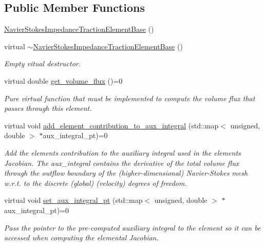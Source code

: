 \subsection*{Public Member Functions}
\begin{DoxyCompactItemize}
\item 
\hyperlink{classoomph_1_1NavierStokesImpedanceTractionElementBase_a5879757e9fd1c596fa2bb60321c97270}{Navier\+Stokes\+Impedance\+Traction\+Element\+Base} ()
\item 
virtual \hyperlink{classoomph_1_1NavierStokesImpedanceTractionElementBase_a3162972ba2dfdff8bbae08f27efaf132}{$\sim$\+Navier\+Stokes\+Impedance\+Traction\+Element\+Base} ()
\begin{DoxyCompactList}\small\item\em Empty vitual destructor. \end{DoxyCompactList}\item 
virtual double \hyperlink{classoomph_1_1NavierStokesImpedanceTractionElementBase_a7f71882ae8a0d34e3d5a5c91586081b3}{get\+\_\+volume\+\_\+flux} ()=0
\begin{DoxyCompactList}\small\item\em Pure virtual function that must be implemented to compute the volume flux that passes through this element. \end{DoxyCompactList}\item 
virtual void \hyperlink{classoomph_1_1NavierStokesImpedanceTractionElementBase_a4ce2150b59ff999c24e623b645f1c899}{add\+\_\+element\+\_\+contribution\+\_\+to\+\_\+aux\+\_\+integral} (std\+::map$<$ unsigned, double $>$ $\ast$aux\+\_\+integral\+\_\+pt)=0
\begin{DoxyCompactList}\small\item\em Add the element\textquotesingle{}s contribution to the auxiliary integral used in the element\textquotesingle{}s Jacobian. The aux\+\_\+integral contains the derivative of the total volume flux through the outflow boundary of the (higher-\/dimensional) Navier-\/\+Stokes mesh w.\+r.\+t. to the discrete (global) (velocity) degrees of freedom. \end{DoxyCompactList}\item 
virtual void \hyperlink{classoomph_1_1NavierStokesImpedanceTractionElementBase_ac9583fd74bc1bb57101bce20fffa39d3}{set\+\_\+aux\+\_\+integral\+\_\+pt} (std\+::map$<$ unsigned, double $>$ $\ast$aux\+\_\+integral\+\_\+pt)=0
\begin{DoxyCompactList}\small\item\em Pass the pointer to the pre-\/computed auxiliary integral to the element so it can be accessed when computing the elemental Jacobian. \end{DoxyCompactList}\item 

\end{DoxyCompactItemize}

